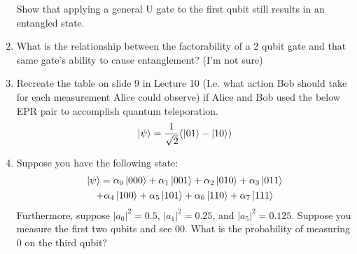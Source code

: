 \documentclass[12pt]{article}
\begin{document}
\begin{enumerate}[font=\bfseries]
    Show that applying a general U gate to the first qubit still results in an entangled state.
    \item What is the relationship between the factorability of a 2 qubit gate and that same gate's ability to cause entanglement? (I'm not sure)
    \item Recreate the table on slide 9 in Lecture 10 (I.e. what action Bob should take for each measurement Alice could observe) if Alice and Bob used the below EPR pair to accomplish quantum teleporation.
    \[\ket{\psi} = \frac{1}{\sqrt{2}}(\ket{01}-\ket{10})\]
    \item Suppose you have the following state:
    \begin{multline} \ket{\psi} = 
        \alpha_0\ket{000} + \alpha_1\ket{001} +
                    \alpha_2\ket{010} + \alpha_3\ket{011}  \\
                    + \alpha_4\ket{100} + \alpha_5\ket{101} +
                    \alpha_6\ket{110} + \alpha_7\ket{111}
    \end{multline}
    Furthermore, suppose $|a_0|^2 = 0.5$, $|a_1|^2 = 0.25$, and $|a_5|^2 = 0.125$. Suppose you measure the first two qubits and see $00$. What is the probability of measuring 0 on the third qubit?
\end{enumerate}
\end{document}
